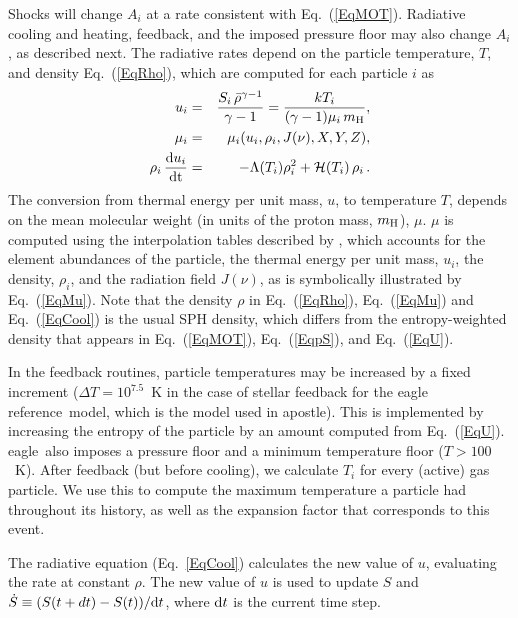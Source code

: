 \documentclass[10pt, a4paper]{article}
\newcommand{\eagle}{{\sc eagle}}
\newcommand{\apostle}{{\sc apostle}}
\newcommand{\REF}{{\sc eagle reference}}
\begin{document}
Shocks will change $A_i$ at a rate consistent with Eq.~(\ref{EqMOT}). Radiative cooling and heating, feedback, and the imposed pressure floor may also change $A_i$, as described next.  The radiative rates depend on the particle temperature, $T$, and density Eq.~(\ref{EqRho}), which are computed for each particle $i$ as
\begin{eqnarray}
\label{EqU}
u_i &=& {S_i\,\bar{\rho}^{\gamma-1}\over \gamma-1} = {kT_i\over (\gamma-1)\mu_i\,m_{\rm H}},\\
\label{EqMu}
\mu_i &=& \mu_i(u_i, \rho_i, J(\nu), X, Y, Z),\\
\label{EqCool}
\rho_i\,{{\rm d}u_i\over {\rm dt}} &=& -\Lambda(T_i)\rho_i^2+{\cal H}(T_i)\,\rho_i\,.
\end{eqnarray}
The conversion from thermal energy per unit mass, $u$, to temperature $T$, depends on the mean molecular weight (in units of the proton mass, $m_{\rm H}$), $\mu$. $\mu$ is computed using the interpolation tables described by \cite{2009MNRAS.393...99W}, which accounts for the element abundances of the particle, the thermal energy per unit mass, $u_i$, the density, $\rho_i$, and the radiation field $J(\nu)$, as is symbolically illustrated by Eq.~(\ref{EqMu}). Note that the density $\rho$ in Eq.~(\ref{EqRho}), Eq.~(\ref{EqMu}) and Eq.~(\ref{EqCool}) is the usual SPH density, which differs from the entropy-weighted density that appears in Eq.~(\ref{EqMOT}), Eq.~(\ref{EqpS}), and Eq.~(\ref{EqU}).

In the feedback routines, particle temperatures may be increased by a fixed increment ($\Delta T=10^{7.5}$~K in the case of stellar feedback for the \REF\ model, which is the model used in \apostle). This is implemented by increasing the entropy of the particle by an amount computed from Eq.~(\ref{EqU}). \eagle\ also imposes a pressure floor and a minimum temperature floor ($T>100$~K). After feedback (but before cooling), we calculate $T_i$ for every (active) gas particle. We use this to compute the maximum temperature a particle had throughout its history, as well as the expansion factor that corresponds to this event.

The radiative equation (Eq.~\ref{EqCool}) calculates the new value of $u$, evaluating the rate at constant $\rho$. The new value of $u$ is used to update $S$ and $\dot S\equiv (S(t+dt)-S(t))/{\rm d}t$, where ${\rm d}t$ is the current time step.
\end{document}
